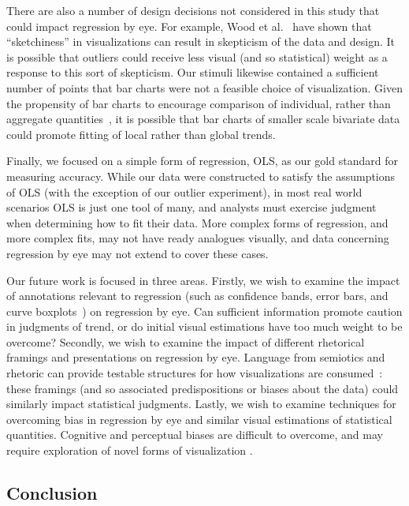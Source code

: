 \documentclass{sigchi}
\begin{document}
There are also a number of design decisions not considered in this study that could impact regression by eye. For example, Wood et al.~\cite{wood2012sketchy} have shown that ``sketchiness'' in visualizations can result in skepticism of the data and design. It is possible that outliers could receive less visual (and so statistical) weight as a response to this sort of skepticism. Our stimuli likewise contained a sufficient number of points that bar charts were not a feasible choice of visualization. Given the propensity of bar charts to encourage comparison of individual, rather than aggregate quantities~\cite{zacks1999bars}, it is possible that bar charts of smaller scale bivariate data could promote fitting of local rather than global trends.

Finally, we focused on a simple form of regression, OLS, as our gold standard for measuring accuracy. While our data were constructed to satisfy the assumptions of OLS (with the exception of our outlier experiment), in most real world scenarios OLS is just one tool of many, and analysts must exercise judgment when determining how to fit their data. More complex forms of regression, and more complex fits, may not have ready analogues visually, and data concerning regression by eye may not extend to cover these cases.

Our future work is focused in three areas. Firstly, we wish to examine the impact of annotations relevant to regression (such as confidence bands, error bars, and curve boxplots~\cite{mirzargar2014curve}) on regression by eye. Can sufficient information promote caution in judgments of trend, or do initial visual estimations have too much weight to be overcome? Secondly, we wish to examine the impact of different rhetorical framings and presentations on regression by eye. Language from semiotics and rhetoric can provide testable structures for how visualizations are consumed~\cite{hullman2011visualization}: these framings (and so associated predispositions or biases about the data) could similarly impact statistical judgments. Lastly, we wish to examine techniques for overcoming bias in regression by eye and similar visual estimations of statistical quantities. Cognitive and perceptual biases are difficult to overcome, and may require exploration of novel forms of visualization \cite{micallef2012assessing}.

\subsection{Conclusion}
\end{document}

